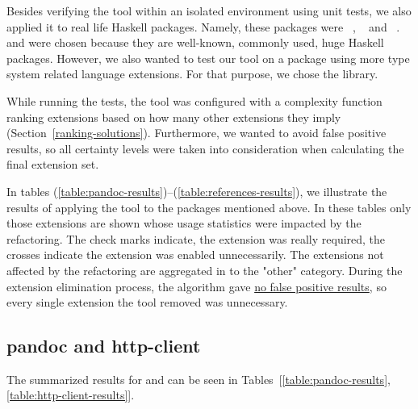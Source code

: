 \documentclass[main.tex]{subfiles}
\begin{document}
	
	\newcommand{\mc}[3]{\multicolumn{#1}{#2}{#3}}
	\newcommand{\required}{\mc{1}{c|}{\cmark}}
	\newcommand{\unused}  {\mc{1}{c||}{\xmark}}
	
	Besides verifying the tool within an isolated environment using unit tests, we also applied it to real life Haskell packages. Namely, these packages were ~\cite{pandoc}, ~\cite{http-client} and ~\cite{references-bib}.  and  were chosen because they are well-known, commonly used, huge Haskell packages. However, we also wanted to test our tool on a package using more type system related language extensions. For that purpose, we chose the  library.
	
	While running the tests, the tool was configured with a complexity function ranking extensions based on how many other extensions they imply (Section~\ref{ranking-solutions}). Furthermore, we wanted to avoid false positive results, so all certainty levels were taken into consideration when calculating the final extension set.
	
	In tables (\ref{table:pandoc-results})--(\ref{table:references-results}), we illustrate the results of applying the tool to the packages mentioned above. In these tables only those extensions are shown whose usage statistics were impacted by the refactoring. The check marks indicate, the extension was really required, the crosses indicate the extension was enabled unnecessarily. The extensions not affected by the refactoring are aggregated in to the "other" category. During the extension elimination process, the algorithm gave \underline{no false positive results}, so every single extension the tool removed was unnecessary.
	
	\subsection{pandoc and http-client}
	
	The summarized results for  and  can be seen in Tables~[\ref{table:pandoc-results},\ref{table:http-client-results}].
	
\end{document}
